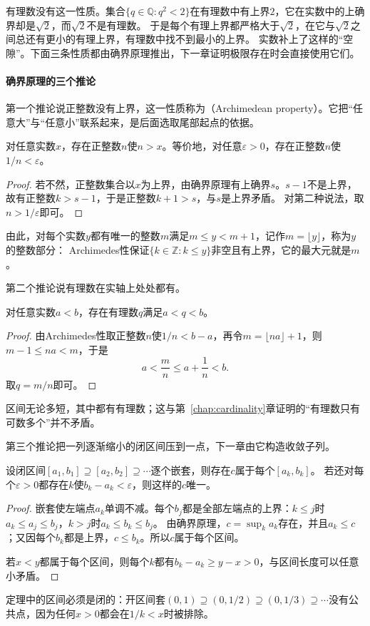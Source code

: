 有理数没有这一性质。集合$\{q\in\mathbb Q:q^2<2\}$在有理数中有上界$2$，它在实数中的上确界却是$\sqrt2$，而$\sqrt2$不是有理数。
于是每个有理上界都严格大于$\sqrt2$，在它与$\sqrt2$之间总还有更小的有理上界，有理数中找不到最小的上界。
实数补上了这样的“空隙”。下面三条性质都由确界原理推出，下一章证明极限存在时会直接使用它们。

\paragraph{确界原理的三个推论}
第一个推论说正整数没有上界，这一性质称为（Archimedean property）。它把“任意大”与“任意小”联系起来，是后面选取尾部起点的依据。
\begin{theorem}[Archimedes性]
\label{thm:ru-archimedean}
对任意实数$x$，存在正整数$n$使$n>x$。等价地，对任意$\varepsilon>0$，存在正整数$n$使$1/n<\varepsilon$。
\end{theorem}
\begin{proof}
若不然，正整数集合以$x$为上界，由确界原理有上确界$s$。$s-1$不是上界，故有正整数$k>s-1$，于是正整数$k+1>s$，与$s$是上界矛盾。
对第二种说法，取$n>1/\varepsilon$即可。
\end{proof}
由此，对每个实数$y$都有唯一的整数$m$满足$m\leq y<m+1$，记作$m=\lfloor y\rfloor$，称为$y$的整数部分：
Archimedes性保证$\{k\in\mathbb Z:k\leq y\}$非空且有上界，它的最大元就是$m$。

第二个推论说有理数在实轴上处处都有。
\begin{theorem}[有理数的稠密性]
\label{thm:ru-rational-density}
对任意实数$a<b$，存在有理数$q$满足$a<q<b$。
\end{theorem}
\begin{proof}
由Archimedes性取正整数$n$使$1/n<b-a$，再令$m=\lfloor na\rfloor+1$，则$m-1\leq na<m$，于是
\[
 a<\frac mn\leq a+\frac1n<b.
\]
取$q=m/n$即可。
\end{proof}
区间无论多短，其中都有有理数；这与第~\ref{chap:cardinality}章证明的“有理数只有可数多个”并不矛盾。

第三个推论把一列逐渐缩小的闭区间压到一点，下一章由它构造收敛子列。
\begin{theorem}[闭区间套定理]
\label{thm:ru-nested-intervals}
设闭区间$[a_1,b_1]\supseteq[a_2,b_2]\supseteq\cdots$逐个嵌套，则存在$c$属于每个$[a_k,b_k]$。
若还对每个$\varepsilon>0$都存在$k$使$b_k-a_k<\varepsilon$，则这样的$c$唯一。
\end{theorem}
\begin{proof}
嵌套使左端点$a_k$单调不减。每个$b_j$都是全部左端点的上界：$k\leq j$时$a_k\leq a_j\leq b_j$，$k>j$时$a_k\leq b_k\leq b_j$。
由确界原理，$c=\sup_ka_k$存在，并且$a_k\leq c$；又因每个$b_k$都是上界，$c\leq b_k$。所以$c$属于每个区间。

若$x<y$都属于每个区间，则每个$k$都有$b_k-a_k\geq y-x>0$，与区间长度可以任意小矛盾。
\end{proof}
定理中的区间必须是闭的：开区间套$(0,1)\supseteq(0,1/2)\supseteq(0,1/3)\supseteq\cdots$没有公共点，因为任何$x>0$都会在$1/k<x$时被排除。
